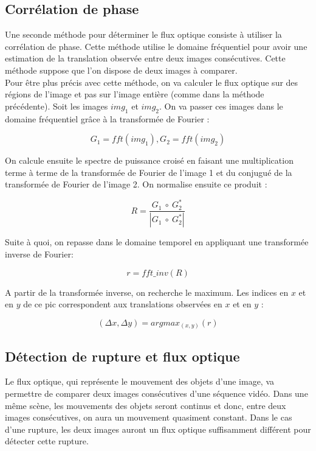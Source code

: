 \subsection{Corrélation de phase}

Une seconde méthode pour déterminer le flux optique consiste à utiliser la corrélation de phase. Cette méthode utilise le domaine fréquentiel pour avoir une estimation de la translation observée entre deux images consécutives. Cette méthode suppose que l'on dispose de deux images à comparer.\\

Pour être plus précis avec cette méthode, on va calculer le flux optique sur des régions de l'image et pas sur l'image entière (comme dans la méthode précédente). Soit les images $img_1$ et $img_2$. On va passer ces images dans le domaine fréquentiel grâce à la transformée de Fourier :

\[
	G_1 = fft(img_1), G_2 = fft(img_2)
\]

On calcule ensuite le spectre de puissance croisé en faisant une multiplication terme à terme de la transformée de Fourier de l'image 1 et du conjugué de la transformée de Fourier de l'image 2. On normalise ensuite ce produit :

\[
	R = \frac{G_1 \ \circ \ G_2^*}{|G_1 \ \circ \ G_2^*|}
\]

Suite à quoi, on repasse dans le domaine temporel en appliquant une transformée inverse de Fourier:

\[
	r = fft\_inv(R)
\]

A partir de la transformée inverse, on recherche le maximum. Les indices en $x$ et en $y$ de ce pic correspondent aux translations observées en $x$ et en $y$ :

\[
	(\Delta x, \Delta y) = argmax_{(x, y)}(r)
\]


\subsection{Détection de rupture et flux optique}

Le flux optique, qui représente le mouvement des objets d'une image, va permettre de comparer deux images consécutives d'une séquence vidéo. Dans une même scène, les mouvements des objets seront continus et donc, entre deux images consécutives, on aura un mouvement quasiment constant. Dans le cas d'une rupture, les deux images auront un flux optique suffisamment différent pour détecter cette rupture.\\

